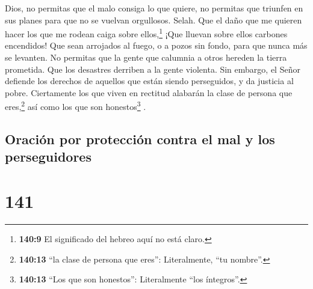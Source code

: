  Dios, no permitas que el malo consiga lo que quiere, no
permitas que triunfen en sus planes para que no se vuelvan orgullosos.
Selah.  Que el daño que me quieren hacer los que me rodean
caiga sobre ellos,\footnote{\textbf{140:9} El significado del hebreo
  aquí no está claro.}  ¡Que lluevan sobre ellos carbones
encendidos! Que sean arrojados al fuego, o a pozos sin fondo, para que
nunca más se levanten.  No permitas que la gente que
calumnia a otros hereden la tierra prometida. Que los desastres derriben
a la gente violenta.  Sin embargo, el Señor defiende los
derechos de aquellos que están siendo perseguidos, y da justicia al
pobre.  Ciertamente los que viven en rectitud alabarán la
clase de persona que eres,\footnote{\textbf{140:13} ``la clase de
  persona que eres'': Literalmente, ``tu nombre''.} así como los que son
honestos\footnote{\textbf{140:13} ``Los que son honestos'': Literalmente
  ``los íntegros''.} .

\hypertarget{oraciuxf3n-por-protecciuxf3n-contra-el-mal-y-los-perseguidores}{%
\subsection{Oración por protección contra el mal y los
perseguidores}\label{oraciuxf3n-por-protecciuxf3n-contra-el-mal-y-los-perseguidores}}

\hypertarget{section-140}{%
\section{141}\label{section-140}}

